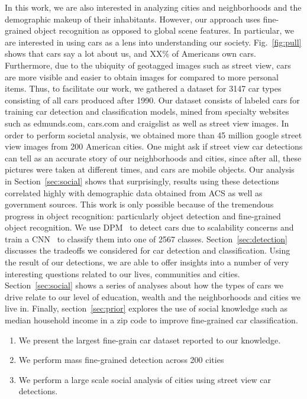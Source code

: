 \documentclass[10pt,twocolumn,letterpaper]{article}
\begin{document}
In this work, we are also interested in analyzing cities and neighborhoods and the demographic makeup of their inhabitants. However, our approach uses fine-grained object recognition as opposed to global scene features. In particular, we are interested in using cars as a lens into understanding our society. Fig.~\ref{fig:pull} shows that cars say a lot about us, and XX\% of Americans own cars. Furthermore, due to the ubiquity of geotagged images such as street view, cars are more visible and easier to obtain images for compared to more personal items. Thus, to facilitate our work, we gathered a dataset for 3147 car types consisting of all cars produced after 1990. Our dataset consists of labeled cars for training car detection and classification models, mined from specialty websites such as edmunds.com, cars.com and craigslist as well as street view images. In order to perform societal analysis, we obtained more than 45 million google street view images from 200 American cities. One might ask if street view car detections can tell as an accurate story of our neighborhoods and cities, since after all, these pictures were taken at different times, and cars are mobile objects. Our analysis in Section~\ref{sec:social} shows that surprisingly, results using these detections correlated highly with demographic data obtained from ACS as well as government sources. This work is only possible because of the tremendous progress in object recognition: particularly object detection and fine-grained object recognition. We use DPM~\cite{dpm} to detect cars due to scalability concerns and train a CNN~\cite{alexnet} to classify them into one of 2567 classes. Section~\ref{sec:detection} discusses the tradeoffs we considered for car detection and classification. Using the result of our detections, we are able to offer insights into a number of very interesting questions related to our lives, communities and cities. Section~\ref{sec:social} shows a series of analyses about how the types of cars we drive relate to our level of education, wealth and the neighborhoods and cities we live in. Finally, section~\ref{sec:prior} explores the use of social knowledge such as median household income in a zip code to improve fine-grained car classification. 

  \begin{enumerate}
    \item We present the largest fine-grain car dataset reported to our knowledge.
    \item We perform mass fine-grained detection across 200 cities 
    \item We perform a large scale social analysis of cities using street view car detections.
  \end{enumerate}
\end{document}
